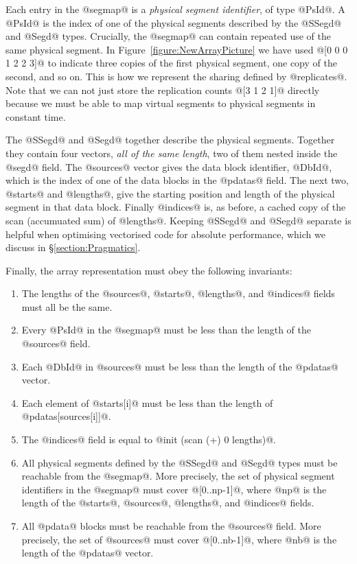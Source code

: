 Each entry in the @segmap@ is a \emph{physical segment identifier}, of type @PsId@. A @PsId@ is the index of one of
the physical segments described by the @SSegd@ and @Segd@ types. Crucially, the @segmap@ can contain repeated use of the same physical segment. In Figure~\ref{figure:NewArrayPicture} we have used @[0 0 0 1 2 2 3]@ to indicate three copies of the first physical segment, one copy of the second, and so on. This is how we represent the sharing defined by @replicates@. Note that we can not just store the replication counts @[3 1 2 1]@ directly because we must be able to map virtual segments to physical segments in constant time.

The @SSegd@ and @Segd@ together describe the physical segments. Together they contain four vectors, \emph{all of the same length}, two of them nested inside the @segd@ field. The @sources@ vector gives the data block identifier, @DbId@, which is the index of one of the data blocks in the @pdatas@ field. The next two, @starts@ and @lengths@, give the starting position and length of the physical segment in that data block. Finally @indices@ is, as before, a cached copy of the scan (accumuated sum) of @lengths@. Keeping @SSegd@ and @Segd@ separate is helpful when optimising vectorised code for absolute performance, which we discuss in \S\ref{section:Pragmatics}. 

Finally, the array representation must obey the following invariants:

\begin{enumerate}
\item	The lengths of the @sources@, @starts@, @lengths@, and @indices@ fields must all be the same.

\item	Every @PsId@ in the @segmap@ must be less than the length of the @sources@ field. 

\item	Each @DbId@ in @sources@ must be less than the length of the @pdatas@ vector.

\item	Each element of @starts[i]@ must be less than the length of @pdatas[sources[i]]@.

\item	The @indices@ field is equal to @init (scan (+) 0 lengths)@.

\item	All physical segments defined by the @SSegd@ and @Segd@ types must be reachable from the @segmap@. More precisely, the set of physical segment identifiers in the @segmap@ must cover @[0..np-1]@, where @np@ is the length of the @starts@, @sources@, @lengths@, and @indices@ fields.

\item	All @pdata@ blocks must be reachable from the @sources@ field.  More precisely, the set of @sources@ must cover @[0..nb-1]@, where @nb@ is the length of the @pdatas@ vector.
\end{enumerate}

